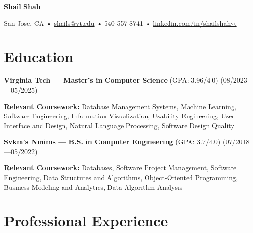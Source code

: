 \documentclass[10pt, letterpaper]{article}
\begin{document}
\begin{center}
    \vspace{6pt}  %
    {\fontsize{20 pt}{22 pt}\selectfont \textbf{Shail Shah}}  %
    \vspace{8pt}  %

    {\fontsize{11 pt}{13 pt}\selectfont  %
    San Jose, CA • \href{mailto:shails@vt.edu}{shails@vt.edu} • 540-557-8741 •  
    \href{https://linkedin.com/in/shailshahvt}{linkedin.com/in/shailshahvt}  
    }
    \vspace{6pt}  %
\end{center}

\section{Education}

\textbf{Virginia Tech — Master's in Computer Science} (GPA: 3.96/4.0) \hfill (08/2023—05/2025)  

\vspace{2pt}  %
\textbf{Relevant Coursework:}  
Database Management Systems, Machine Learning, Software Engineering, Information Visualization,  
Usability Engineering, User Interface and Design, Natural Language Processing, Software Design Quality  

\vspace{6pt}  

\textbf{Svkm’s Nmims — B.S. in Computer Engineering} (GPA: 3.7/4.0) \hfill (07/2018—05/2022)  

\vspace{2pt}  %
\textbf{Relevant Coursework:}  
Databases, Software Project Management, Software Engineering, Data Structures and Algorithms,  
Object-Oriented Programming, Business Modeling and Analytics, Data Algorithm Analysis  

\section{Professional Experience}
\end{document}
